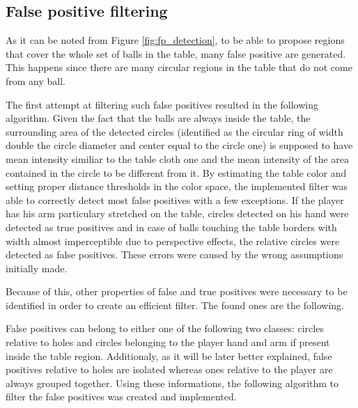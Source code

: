 \subsection{False positive filtering}
As it can be noted from Figure \ref{fig:fp_detection}, to be able to propose regions that cover the whole set of balls in the table, many 
false positive are generated. This happens since there are many circular regions in the table that do not come from any ball.

The first attempt at filtering such false positives resulted in the following algorithm. Given the fact that the balls are always inside the table, the surrounding area
of the detected circles (identified as the circular ring of width double the circle diameter and center equal to the circle one) is supposed to have mean intensity similiar to the table 
cloth one and the mean intensity of the area contained in the circle to be different from it. By estimating the table color
and setting proper distance thresholds in the color space, the implemented filter was able to correctly detect most false positives with a few exceptions.
If the player has his arm particulary stretched on the table, circles detected on his hand were detected as true positives and in case of balls touching the table borders with
width almost imperceptible due to perspective effects, the relative circles were detected as false positives.
These errors were caused by the wrong assumptions initially made.

Because of this, other properties of false and true positives were necessary to be identified in order to create an efficient filter.
The found ones are the following.

False positives can belong to either one of the following two classes: circles relative to holes and circles belonging to the player hand and arm if present 
inside the table region. Additionaly, as it will be later better explained, false positives relative to holes are isolated whereas ones relative to the player are always
grouped together. Using these informations, the following algorithm to filter the false positives was created and implemented.

